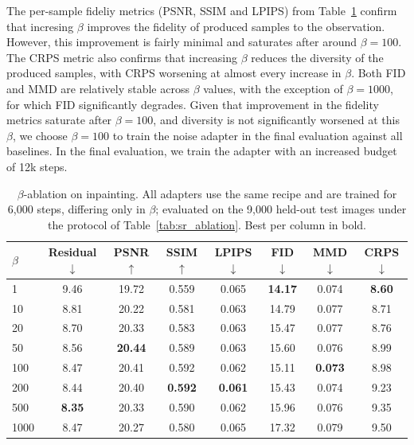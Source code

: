 \documentclass[12pt,a4paper]{report}
\begin{document}
The per-sample fideliy metrics (PSNR, SSIM and LPIPS) from Table~\ref{tab:inp_beta} confirm that incresing $\beta$ improves the fidelity of produced samples to the observation. However, this improvement is fairly minimal and saturates after around $\beta=100$. 
The CRPS metric also confirms that increasing $\beta$ reduces the diversity of the produced samples, with CRPS worsening at almost every increase in $\beta$. 
Both FID and MMD are relatively stable across $\beta$ values, with the exception of $\beta=1000$, for which FID significantly degrades.  
Given that improvement in the fidelity metrics saturate after $\beta=100$, and diversity is not significantly worsened at this $\beta$, we choose $\beta=100$ to train the noise adapter in the final evaluation against all baselines. In the final evaluation, we train the adapter with an increased budget of 12k steps. 


\begin{table}[t]
\centering
\small
\begin{tabular}{l ccccccc}
\toprule
$\beta$ & Residual $\downarrow$ & PSNR $\uparrow$ & SSIM $\uparrow$ & LPIPS $\downarrow$ & FID $\downarrow$ & MMD $\downarrow$ & CRPS $\downarrow$ \\
\midrule
1    & 9.46 & 19.72 & 0.559 & 0.065 & \textbf{14.17} & 0.074 & \textbf{8.60} \\
10   & 8.81 & 20.22 & 0.581 & 0.063 & 14.79 & 0.077 & 8.71 \\
20   & 8.70 & 20.33 & 0.583 & 0.063 & 15.47 & 0.077 & 8.76 \\
50   & 8.56 & \textbf{20.44} & 0.589 & 0.063 & 15.60 & 0.076 & 8.99 \\
100  & 8.47 & 20.41 & 0.592 & 0.062 & 15.11 & \textbf{0.073} & 8.98 \\
200  & 8.44 & 20.40 & \textbf{0.592} & \textbf{0.061} & 15.43 & 0.074 & 9.23 \\
500  & \textbf{8.35} & 20.33 & 0.590 & 0.062 & 15.96 & 0.076 & 9.35 \\
1000 & 8.47 & 20.27 & 0.580 & 0.065 & 17.32 & 0.079 & 9.50 \\
\bottomrule
\end{tabular}
\caption{$\beta$-ablation on inpainting. All adapters use the same recipe and are
trained for 6{,}000 steps, differing only in $\beta$; evaluated on the 9{,}000
held-out test images under the protocol of Table~\ref{tab:sr_ablation}. Best per
column in bold.}
\label{tab:inp_beta}
\end{table}
\end{document}
